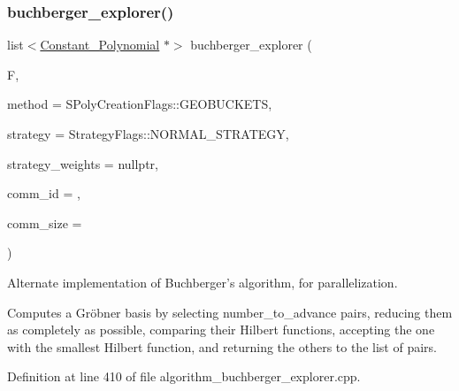 \subsubsection{\texorpdfstring{buchberger\+\_\+explorer()}{buchberger\_explorer()}\hspace{0.1cm}{\footnotesize\ttfamily [1/2]}}
{\footnotesize\ttfamily list$<$\hyperlink{group__polygroup_class_constant___polynomial}{Constant\+\_\+\+Polynomial} $\ast$$>$ buchberger\+\_\+explorer (\begin{DoxyParamCaption}\item[{const vector$<$ \hyperlink{group__polygroup_class_abstract___polynomial}{Abstract\+\_\+\+Polynomial} $\ast$$>$ \&}]{F,  }\item[{\hyperlink{group___g_b_computation_ga73257b8a2d5cc826853a71b77d0cebf2}{S\+Poly\+Creation\+Flags}}]{method = {\ttfamily SPolyCreationFlags\+:\+:GEOBUCKETS},  }\item[{\hyperlink{group__strategygroup_ga0ee6c8e033547330e6b89929730007f4}{Strategy\+Flags}}]{strategy = {\ttfamily StrategyFlags\+:\+:NORMAL\+\_\+STRATEGY},  }\item[{W\+T\+\_\+\+T\+Y\+PE $\ast$}]{strategy\+\_\+weights = {\ttfamily nullptr},  }\item[{const int}]{comm\+\_\+id = {},  }\item[{const int}]{comm\+\_\+size = {} }\end{DoxyParamCaption})}



Alternate implementation of Buchberger's algorithm, for parallelization. 

Computes a Gr\"{o}bner basis by selecting {\ttfamily number\+\_\+to\+\_\+advance} pairs, reducing them as completely as possible, comparing their Hilbert functions, accepting the one with the smallest Hilbert function, and returning the others to the list of pairs. 

Definition at line 410 of file algorithm\+\_\+buchberger\+\_\+explorer.\+cpp.

\mbox{\label{group___g_b_computation_ga40495dfdaa22897e1dfe33aaaec35429}} 
